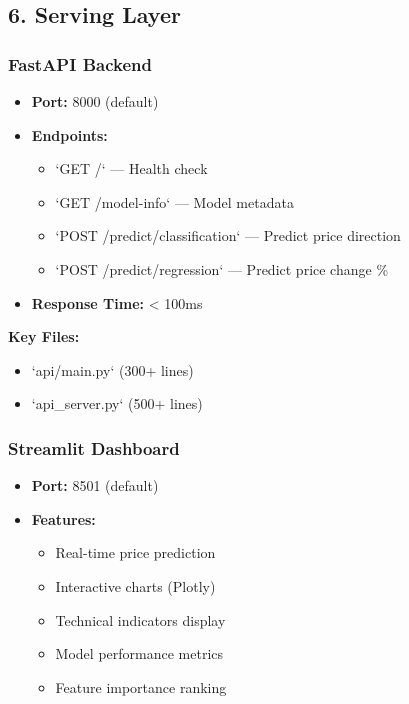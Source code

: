 \subsection{6. Serving Layer}

\subsubsection{FastAPI Backend}
\begin{itemize}
    \item \textbf{Port:} 8000 (default)
    \item \textbf{Endpoints:}
    \begin{itemize}
        \item `GET /` — Health check
        \item `GET /model-info` — Model metadata
        \item `POST /predict/classification` — Predict price direction
        \item `POST /predict/regression` — Predict price change \%
    \end{itemize}
    \item \textbf{Response Time:} < 100ms
\end{itemize}

\textbf{Key Files:}
\begin{itemize}
    \item `api/main.py` (300+ lines)
    \item `api\_server.py` (500+ lines)
\end{itemize}

\subsubsection{Streamlit Dashboard}
\begin{itemize}
    \item \textbf{Port:} 8501 (default)
    \item \textbf{Features:}
    \begin{itemize}
        \item Real-time price prediction
        \item Interactive charts (Plotly)
        \item Technical indicators display
        \item Model performance metrics
        \item Feature importance ranking
    \end{itemize}
\end{itemize}

